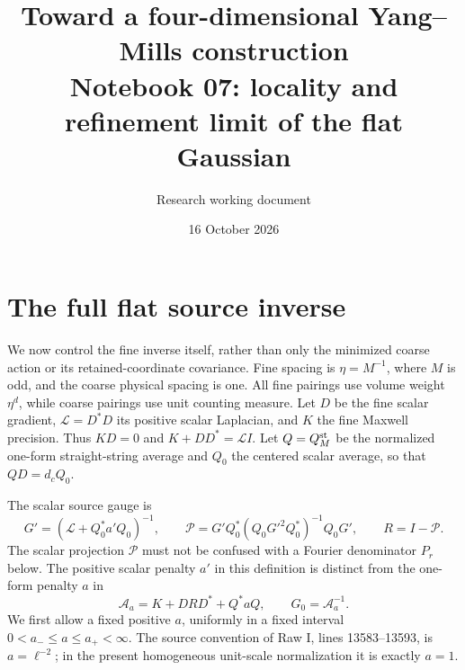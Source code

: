 \documentclass[11pt]{article}
\title{Toward a four-dimensional Yang--Mills construction\\
\large Notebook 07: locality and refinement limit of the flat Gaussian}
\author{Research working document}
\date{16 October 2026}
\theoremstyle{remark}
\newcommand{\norm}[1]{\left\|#1\right\|}
\newcommand{\diag}{\operatorname{diag}}
\begin{document}
\section{The full flat source inverse}
\label{inv-section}

We now control the fine inverse itself, rather than only the minimized
coarse action or its retained-coordinate covariance. Fine spacing is
$\eta=M^{-1}$, where $M$ is odd, and the coarse physical spacing is one.
All fine pairings use volume weight $\eta^d$, while coarse pairings use
unit counting measure. Let $D$ be the fine scalar gradient,
$\mathcal L=D^*D$ its positive scalar Laplacian, and $K$ the fine
Maxwell precision. Thus $KD=0$ and $K+DD^*=\mathcal L I$.
Let $Q=Q_M^{\rm st}$ be the normalized one-form straight-string average
and $Q_0$ the centered scalar average, so that $QD=d_cQ_0$.

The scalar source gauge is
\begin{equation}\label{inv-source-projection}
 G'=(\mathcal L+Q_0^*a'Q_0)^{-1},\qquad
 \mathcal P=G'Q_0^*(Q_0G'^2Q_0^*)^{-1}Q_0G',\qquad R=I-\mathcal P.
\end{equation}
The scalar projection $\mathcal P$ must not be confused with a Fourier
denominator $P_r$ below. The positive scalar penalty $a'$ in this
definition is distinct from the one-form penalty $a$ in
\begin{equation}\label{inv-fine-precision}
 \mathcal A_a=K+DRD^*+Q^*aQ,\qquad G_0=\mathcal A_a^{-1}.
\end{equation}
We first allow a fixed positive $a$, uniformly in a fixed interval
$0<a_-\le a\le a_+<\infty$. The source convention of Raw I,
lines 13583--13593, is $a=\ell^{-2}$; in the present homogeneous
unit-scale normalization it is exactly $a=1$.
\end{document}
